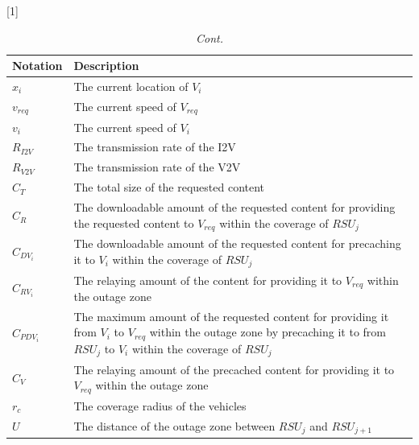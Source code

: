 \documentclass[electronics,aricle,accept,pdftex,moreauthors]{Definitions/mdpi}
\begin{document}
\begin{table}[H] \ContinuedFloat %
\tablesize{\footnotesize}

  \caption{{\em Cont.}}

\setlength{\cellWidtha}{\textwidth/2-2\tabcolsep-2.2in}
\setlength{\cellWidthb}{\textwidth/2-2\tabcolsep+2.2in}
\scalebox{1}[1]{\begin{tabularx}{\textwidth}{>{\centering\arraybackslash}m{\cellWidtha}>{\raggedright
\arraybackslash}m{\cellWidthb}}
\toprule

           \textbf{Notation} & \textbf{Description}\\
\midrule
        $x_{i}$ & The current location of $V_{i}$ \\
        $v_{req}$ & The current speed of $V_{req}$ \\
        $v_{i}$ & The current speed of $V_{i}$ \\

        $R_{I2V}$ & The transmission rate of the I2V \\
        $R_{V2V}$ & The transmission rate of the V2V \\
        $C_{T}$ & The total size of the requested content\\
        $C_{R}$ & The downloadable amount of the requested content for providing the requested content to $V_{req}$ within the coverage of $RSU_{j}$ \\
        $C_{DV_{i}}$ & The downloadable amount of the requested content for precaching it to $V_{i}$ within the coverage of $RSU_{j}$ \\
        $C_{RV_{i}}$ & The relaying amount of the content for providing it to $V_{req}$ within the outage zone \\
        $C_{PDV_{i}}$ & The maximum amount of the requested content for providing it from $V_{i}$ to $V_{req}$ within the outage zone by precaching it to from $RSU_{j}$ to $V_{i}$ within the coverage of $RSU_{j}$ \\
        $C_{V}$ & The relaying amount of the precached content for providing it to $V_{req}$ within the outage zone \\
        $r_{c}$ & The coverage radius of the vehicles\\
        $U$ & The distance of the outage zone between $RSU_{j}$ and $RSU_{j+1}$\\

   \bottomrule
    \end{tabularx}}
    \label{tab.1}
\end{table}
\end{document}
